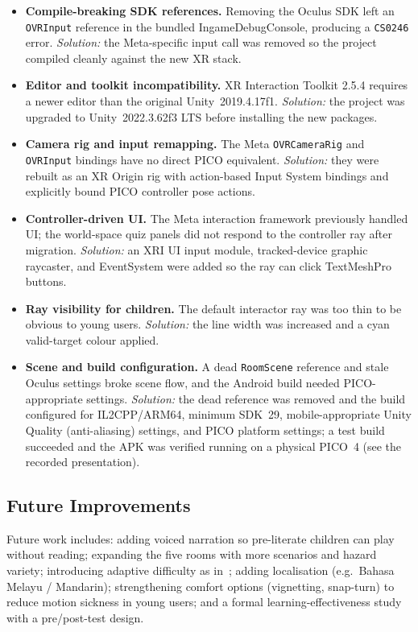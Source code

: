 \documentclass[a4paper,12pt]{article}
\begin{document}
\begin{itemize}
  \item \textbf{Compile-breaking SDK references.} Removing the Oculus SDK left an \texttt{OVRInput} reference in the bundled IngameDebugConsole, producing a \texttt{CS0246} error. \emph{Solution:} the Meta-specific input call was removed so the project compiled cleanly against the new XR stack.
  \item \textbf{Editor and toolkit incompatibility.} XR Interaction Toolkit 2.5.4 requires a newer editor than the original Unity~2019.4.17f1. \emph{Solution:} the project was upgraded to Unity~2022.3.62f3 LTS before installing the new packages.
  \item \textbf{Camera rig and input remapping.} The Meta \texttt{OVRCameraRig} and \texttt{OVRInput} bindings have no direct PICO equivalent. \emph{Solution:} they were rebuilt as an XR Origin rig with action-based Input System bindings and explicitly bound PICO controller pose actions.
  \item \textbf{Controller-driven UI.} The Meta interaction framework previously handled UI; the world-space quiz panels did not respond to the controller ray after migration. \emph{Solution:} an XRI UI input module, tracked-device graphic raycaster, and EventSystem were added so the ray can click TextMeshPro buttons.
  \item \textbf{Ray visibility for children.} The default interactor ray was too thin to be obvious to young users. \emph{Solution:} the line width was increased and a cyan valid-target colour applied.
  \item \textbf{Scene and build configuration.} A dead \texttt{RoomScene} reference and stale Oculus settings broke scene flow, and the Android build needed PICO-appropriate settings. \emph{Solution:} the dead reference was removed and the build configured for IL2CPP/ARM64, minimum SDK~29, mobile-appropriate Unity Quality (anti-aliasing) settings, and PICO platform settings; a test build succeeded and the APK was verified running on a physical PICO~4 (see the recorded presentation).
\end{itemize}

\subsection{Future Improvements}

Future work includes: adding voiced narration so pre-literate children can play without reading; expanding the five rooms with more scenarios and hazard variety; introducing adaptive difficulty as in~\cite{roadsafety2021}; adding localisation (e.g.\ Bahasa Melayu / Mandarin); strengthening comfort options (vignetting, snap-turn) to reduce motion sickness in young users; and a formal learning-effectiveness study with a pre/post-test design.
\end{document}
